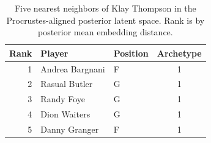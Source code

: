 \begin{table}[htbp]
  \centering\small
  \begin{tabular}{rllc}
    \toprule
    Rank & Player & Position & Archetype \\
    \midrule
    1 & Andrea Bargnani & F & 1 \\
    2 & Rasual Butler & G & 1 \\
    3 & Randy Foye & G & 1 \\
    4 & Dion Waiters & G & 1 \\
    5 & Danny Granger & F & 1 \\
    \bottomrule
  \end{tabular}
  \caption{Five nearest neighbors of Klay Thompson in the Procrustes-aligned posterior latent space. Rank is by posterior mean embedding distance.}
  \label{tab:Klay_Thompson_neighbors}
\end{table}

